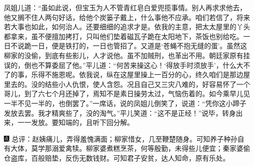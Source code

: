 凤姐儿道：“虽如此说，但宝玉为人不管青红皂白爱兜揽事情。别人再求求他去，他又搁不住人两句好话，给他个炭篓子戴上，什么事他不应承。咱们若信了，将来若大事也如此，如何治人。还要细细的追求才是。依我的主意，把太太屋里的丫头都拿来，虽不便擅加拷打，只叫他们垫着磁瓦子跪在太阳地下，茶饭也别给吃。一日不说跪一日，便是铁打的，一日也管招了。又道是‘苍蝇不抱无缝的蛋’。虽然这柳家的没偷，到底有些影儿，人才说他。虽不加贼刑，也革出不用。朝廷家原有挂误的，倒也不算委屈了他。”平儿道：“何苦来操这心！‘得放手时须放手’，什么大不了的事，乐得不施恩呢。依我说，纵在这屋里操上一百分的心，终久咱们是那边屋里去的。没的结些小人仇恨，使人含怨。况且自己又三灾八难的，好容易怀了一个哥儿，到了六七个月还掉了，焉知不是素日操劳太过，气恼伤着的。如今乘早儿见一半不见一半的，也倒罢了。”一席话，说的凤姐儿倒笑了，说道：“凭你这小蹄子发放去罢。我才精爽些了，没的淘气。”平儿笑道：“这不是正经！”说毕，转身出来，一一发放。要知端的，且听下回分解。

{\includegraphics[width=3mm]{../Images/00005}  \kaishu 总评：赵姨痛儿，弄得羞愧满面；柳家惜女，几至鞭楚随身。可知养子种孙自有大体，莫学那溺爱禽犊。柳家婆煮糕烹茶，何等殷勤，未得些儿便宜；秦家婆偷仓盗库，百般赔垫，反伤无数钱财。可知君子安贫，达人知命，原有乐处。}

